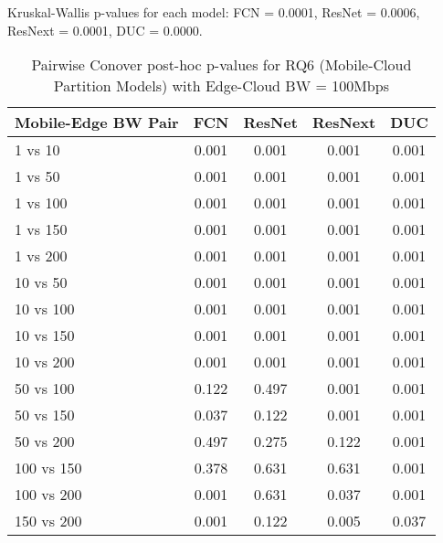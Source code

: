 \begin{table}[h]
\centering
\caption{Pairwise Conover post-hoc p-values for RQ6 (Mobile-Cloud Partition Models) with Edge-Cloud BW = 100Mbps}
\label{tab:conover_mobile_cloud_partition_ec100}
\smallskip
Kruskal-Wallis p-values for each model: FCN = 0.0001, ResNet = 0.0006, ResNext = 0.0001, DUC = 0.0000.

\begin{tabular}{lcccc}
\toprule
Mobile-Edge BW Pair & FCN & ResNet & ResNext & DUC \\
\midrule
1 vs 10 & 0.001 & 0.001 & 0.001 & 0.001 \\
1 vs 50 & 0.001 & 0.001 & 0.001 & 0.001 \\
1 vs 100 & 0.001 & 0.001 & 0.001 & 0.001 \\
1 vs 150 & 0.001 & 0.001 & 0.001 & 0.001 \\
1 vs 200 & 0.001 & 0.001 & 0.001 & 0.001 \\
10 vs 50 & 0.001 & 0.001 & 0.001 & 0.001 \\
10 vs 100 & 0.001 & 0.001 & 0.001 & 0.001 \\
10 vs 150 & 0.001 & 0.001 & 0.001 & 0.001 \\
10 vs 200 & 0.001 & 0.001 & 0.001 & 0.001 \\
50 vs 100 & 0.122 & 0.497 & 0.001 & 0.001 \\
50 vs 150 & 0.037 & 0.122 & 0.001 & 0.001 \\
50 vs 200 & 0.497 & 0.275 & 0.122 & 0.001 \\
100 vs 150 & 0.378 & 0.631 & 0.631 & 0.001 \\
100 vs 200 & 0.001 & 0.631 & 0.037 & 0.001 \\
150 vs 200 & 0.001 & 0.122 & 0.005 & 0.037 \\
\bottomrule
\end{tabular}
\end{table}

